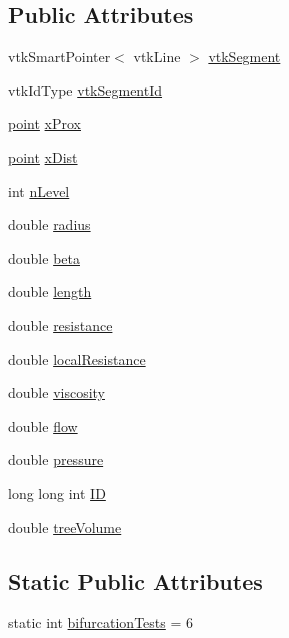 \subsection*{Public Attributes}
\begin{DoxyCompactItemize}
\item 
vtk\+Smart\+Pointer$<$ vtk\+Line $>$ \hyperlink{class_single_vessel_af37e0b95e68662ded08ef7037b64b7e4}{vtk\+Segment}
\item 
vtk\+Id\+Type \hyperlink{class_single_vessel_aa283409729185f57950d58a483b7d661}{vtk\+Segment\+Id}
\item 
\hyperlink{structpoint}{point} \hyperlink{class_single_vessel_a22d0c3617e92838a3a45310b9cbe7f91}{x\+Prox}
\item 
\hyperlink{structpoint}{point} \hyperlink{class_single_vessel_aff9be7494294fb039b2aa284eb39c171}{x\+Dist}
\item 
int \hyperlink{class_single_vessel_acb4f005fc124382aa5dac06194b43007}{n\+Level}
\item 
double \hyperlink{class_single_vessel_a972becbedffb100e3839f5fb06d54ee3}{radius}
\item 
double \hyperlink{class_single_vessel_ae31525b610b4ef7f7c61db0446a983a2}{beta}
\item 
double \hyperlink{class_single_vessel_af96ace62c72b4c495e625724fdc69c1f}{length}
\item 
double \hyperlink{class_single_vessel_ac629f35d34a3adb31f92b06823b320b2}{resistance}
\item 
double \hyperlink{class_single_vessel_a8f5954708c5334dc8ed9f10693381566}{local\+Resistance}
\item 
double \hyperlink{class_single_vessel_ab11b1dc88a1725b79d6ef2344680cf77}{viscosity}
\item 
double \hyperlink{class_single_vessel_a31a369f55958ce8d945fab6781e577c4}{flow}
\item 
double \hyperlink{class_single_vessel_af3e07bf47e7fbc3f04bfa9c7aaa51926}{pressure}
\item 
long long int \hyperlink{class_single_vessel_ab59549ae5a43283077be9bbb25cc01a6}{ID}
\item 
double \hyperlink{class_single_vessel_a2d9634eeadb4fce742f5bfdf4f9077ed}{tree\+Volume}
\end{DoxyCompactItemize}
\subsection*{Static Public Attributes}
\begin{DoxyCompactItemize}
\item 
static int \hyperlink{class_single_vessel_a4ba9764d805e456b1a5a911547bafe87}{bifurcation\+Tests} = 6
\end{DoxyCompactItemize}
